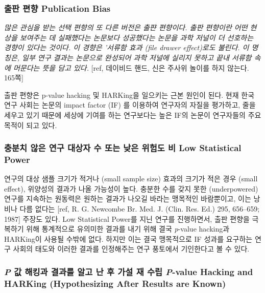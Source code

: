 \documentclass[]{book}
\begin{document}
\hypertarget{publication-bias}{%
\subsubsection{출판 편향 Publication Bias}\label{publication-bias}}

\emph{많은 관심을 받는 선택 편향의 또 다른 버전은 출퍈 편향이다. 출판 편향이란 어떤 현상을 보여주는 데 실패했다는 논문보다 성공했다는 논문을 과학 저널이 더 선호하는 경향이 있다는 것이다. 이 경향은 '서류함 효과 (file drawer effect)로도 불린다. 이 명칭은, 일부 연구 결과는 논문으로 완성되어 과학 저널에 실리지 못하고 끝내 서류함 속에 머문다는 뜻을 담고 있다.}
{[}ref, 데이비드 핸드, 신은 주사위 놀이를 하지 않는다. 165쪽{]}

출판 편향은 p-value hacking 및 HARKing을 일으키는 근본 원인이 된다. 현재 한국 연구 사회는 논문의 impact factor (IF) 를 이용하여 연구자의 자질을 평가하고, 줄을 세우고 있기 때문에 세상에 기여를 하는 연구보다는 높은 IF의 논문이 연구자들의 주요 목적이 되고 있다.

\hypertarget{low-statistical-power}{%
\subsubsection{충분치 않은 연구 대상자 수 또는 낮은 위험도 비 Low Statistical Power}\label{low-statistical-power}}

연구의 대상 샘플 크기가 적거나 (small sample size) 효과의 크기가 적은 경우 (small effect), 위양성의 결과가 나올 가능성이 높다. 충분한 수를 갖지 못한 (underpowered) 연구를 지속하는 원동력은 원하는 결과가 나오길 바라는 맹목적인 바람뿐이고, 이는 낭비나 다름 없다는 {[}ref, R. G. Newcombe Br. Med. J. (Clin. Res. Ed.) 295, 656--659; 1987{]} 주장도 있다. Low Statistical Power를 지닌 연구를 진행하면서, 출판 편향을 극복하기 위해 통계적으로 유의미한 결과를 내기 위해 결국 \emph{p}-value hacking과 HARKing이 사용될 수밖에 없다. 하지만 이는 결국 맹목적으로 IF 성과를 요구하는 연구 사회의 태도와 이러한 결과를 인정해주는 연구 풍토에서 기인한다고 볼 수 있다.

\hypertarget{p----------p-value-hacking-and-harking-hypothesizing-after-results-are-known}{%
\subsubsection{\texorpdfstring{\emph{P} 값 해킹과 결과를 알고 난 후 가설 재 수립 \emph{P}-value Hacking and HARKing (Hypothesizing After Results are Known)}{P 값 해킹과 결과를 알고 난 후 가설 재 수립 P-value Hacking and HARKing (Hypothesizing After Results are Known)}}\label{p----------p-value-hacking-and-harking-hypothesizing-after-results-are-known}}
\end{document}
